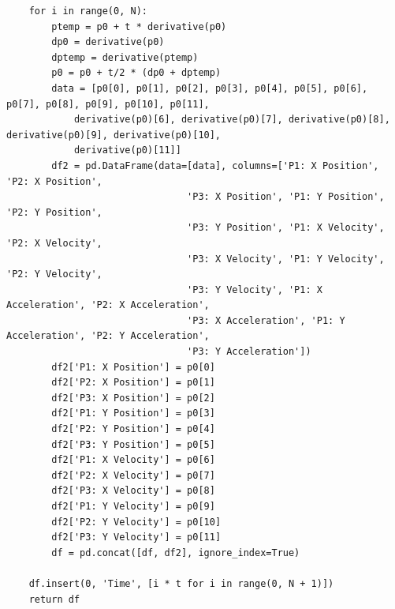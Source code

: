 \documentclass{article}
\begin{document}
\begin{verbatim}
    for i in range(0, N):
        ptemp = p0 + t * derivative(p0)
        dp0 = derivative(p0)
        dptemp = derivative(ptemp)
        p0 = p0 + t/2 * (dp0 + dptemp)
        data = [p0[0], p0[1], p0[2], p0[3], p0[4], p0[5], p0[6], p0[7], p0[8], p0[9], p0[10], p0[11], 
            derivative(p0)[6], derivative(p0)[7], derivative(p0)[8], derivative(p0)[9], derivative(p0)[10], 
            derivative(p0)[11]]
        df2 = pd.DataFrame(data=[data], columns=['P1: X Position', 'P2: X Position', 
                                'P3: X Position', 'P1: Y Position', 'P2: Y Position', 
                                'P3: Y Position', 'P1: X Velocity', 'P2: X Velocity', 
                                'P3: X Velocity', 'P1: Y Velocity', 'P2: Y Velocity', 
                                'P3: Y Velocity', 'P1: X Acceleration', 'P2: X Acceleration', 
                                'P3: X Acceleration', 'P1: Y Acceleration', 'P2: Y Acceleration', 
                                'P3: Y Acceleration'])
        df2['P1: X Position'] = p0[0]
        df2['P2: X Position'] = p0[1]
        df2['P3: X Position'] = p0[2]
        df2['P1: Y Position'] = p0[3]
        df2['P2: Y Position'] = p0[4]
        df2['P3: Y Position'] = p0[5]
        df2['P1: X Velocity'] = p0[6]
        df2['P2: X Velocity'] = p0[7]
        df2['P3: X Velocity'] = p0[8]
        df2['P1: Y Velocity'] = p0[9]
        df2['P2: Y Velocity'] = p0[10]
        df2['P3: Y Velocity'] = p0[11]
        df = pd.concat([df, df2], ignore_index=True)
    
    df.insert(0, 'Time', [i * t for i in range(0, N + 1)])
    return df
\end{verbatim}
\end{document}

